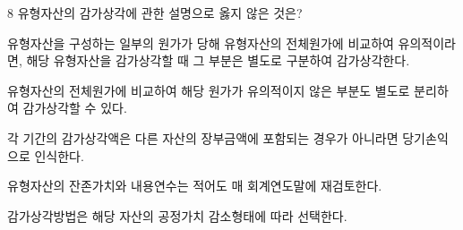 \begin{question}{8}
유형자산의 감가상각에 관한 설명으로 옳지 않은 것은?
\begin{choices}
  \item 유형자산을 구성하는 일부의 원가가 당해 유형자산의 전체원가에 비교하여 유의적이라면, 해당 유형자산을 감가상각할 때 그 부분은 별도로 구분하여 감가상각한다.
  \item 유형자산의 전체원가에 비교하여 해당 원가가 유의적이지 않은 부분도 별도로 분리하여 감가상각할 수 있다.
  \item 각 기간의 감가상각액은 다른 자산의 장부금액에 포함되는 경우가 아니라면 당기손익으로 인식한다.
  \item 유형자산의 잔존가치와 내용연수는 적어도 매 회계연도말에 재검토한다.
  \item 감가상각방법은 해당 자산의 공정가치 감소형태에 따라 선택한다.
\end{choices}
\end{question}
